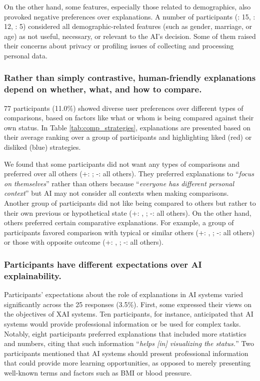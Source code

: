On the other hand, some features, especially those related to demographics, also provoked negative preferences over explanations. A number of participants (\recomN: 15, \recomP: 12, \loanN: 5) considered all demographic-related features (such as gender, marriage, or age) as not useful, necessary, or relevant to the AI's decision. Some of them raised their concerns about privacy or profiling issues of collecting and processing personal data. 



\subsubsection{Rather than simply contrastive, human-friendly explanations depend on whether, what, and how to compare.}
\label{sec:contrastive}
77 participants (11.0\%) showed diverse user preferences over different types of comparisons, based on factors like what or whom is being compared against their own status. In Table \ref{tab:comp_strategies}, explanations are presented based on their average ranking over a group of participants and highlighting liked (red) or disliked (blue) strategies. 

We found that some participants did not want any types of comparisons and preferred \comp over all others (+: \comp; -: all others). They preferred explanations to ``\textit{focus on themselves}'' rather than others because ``\textit{everyone has different personal context}'' but AI may not consider all contexts when making comparisons. Another group of participants did not like being compared to others but rather to their own previous or hypothetical state (+: \cf, \ctt; -: all others). On the other hand, others preferred certain comparative explanations. For example, a group of participants favored comparison with typical or similar others (+: \cbho, \cbhe; -: all others) or those with opposite outcome (+: \cto, \ctt; -: all others).

\subsubsection{Participants have different expectations over AI explainability.}
\label{sec:ai-system}

Participants' expectations about the role of explanations in AI systems varied significantly across the 25 responses (3.5\%). First, some expressed their views on the objectives of XAI systems. Ten participants, for instance, anticipated that AI systems would provide professional information or be used for complex tasks. Notably, eight participants preferred explanations that included more statistics and numbers, citing that such information ``{\it helps [in] visualizing the status.}'' Two participants mentioned that AI systems should present professional information that could provide more learning opportunities, as opposed to merely presenting well-known terms and factors such as BMI or blood pressure.

